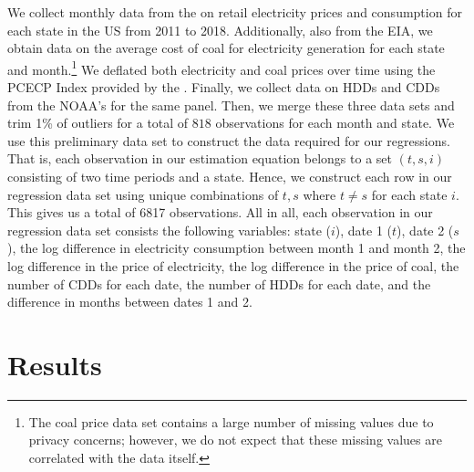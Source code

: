 \documentclass[11pt,a4paper]{extarticle}
\begin{document}
We collect monthly data from the \cite{EIANetgen} on retail electricity prices and consumption for each state in the US from 2011 to 2018. Additionally, also from the EIA, we obtain data on the average cost of coal for electricity generation for each state and month.\footnote{ The coal price data set contains a large number of missing values due to privacy concerns; however, we do not expect that these missing values are correlated with the data itself.} We deflated both electricity and coal prices over time using the PCECP Index provided by the  \cite{USBEA}. 
Finally, we collect data on HDDs and CDDs from the NOAA's \citet{CPC} for the same panel. Then, we merge these three data sets and trim 1\% of outliers for a total of $818$ observations for each month and state. We use this preliminary data set to construct the data required for our regressions. That is, each observation in our estimation equation belongs to a set $(t,s,i)$ consisting of two time periods and a state. Hence, we construct each row in our regression data set using unique combinations of $t,s$ where $t \neq s$ for each state $i$. This gives us a total of 6817 observations.  All in all, each observation in our regression data set consists the following variables: state ($i$), date 1 ($t$), date 2 ($s$), the log difference in electricity consumption between month 1 and month 2, the log difference in the price of electricity, the log difference in the price of coal, the number of CDDs for each date, the number of HDDs for each date, and the difference in months between dates 1 and 2. 



\section{Results}
\end{document}
